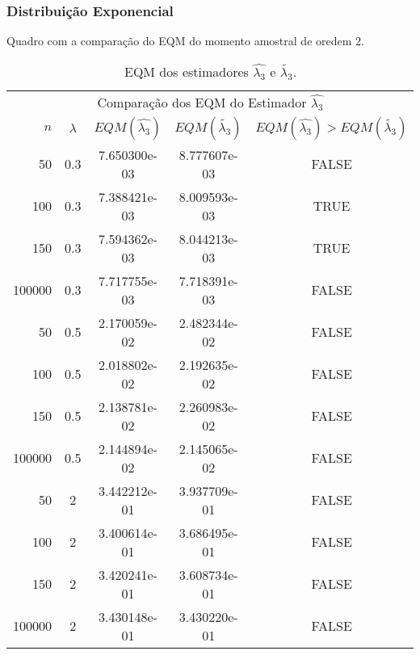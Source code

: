 \begin{frame}
\frametitle{Distribuição Exponencial}
Quadro com a comparação do EQM do momento amostral de oredem 2.

\begin{table}[H]
\caption{EQM dos estimadores $\hat{\lambda_{3}}$ e $\tilde{\lambda_{3}}$.}
\label{tab:p1EQM}
\tiny
\centering
\begin{tabular}{rcccc}
\toprule
\multicolumn{5}{c}{Comparação dos EQM do Estimador $\hat{\lambda_{3}}$}\\
$n$ & $\lambda$ & $EQM(\hat{\lambda_{3}})$ & $EQM(\tilde{\lambda_{3}})$ & $EQM(\hat{\lambda_{3}})>EQM(\tilde{\lambda_{3}})$ \\
\midrule
50 & 0.3 & 7.650300e-03 & 8.777607e-03  & FALSE \\
100 & 0.3 & 7.388421e-03 & 8.009593e-03 & TRUE \\
150 & 0.3 & 7.594362e-03 & 8.044213e-03 & TRUE \\
100000 & 0.3 & 7.717755e-03 & 7.718391e-03 & FALSE \\
\midrule
50 & 0.5 & 2.170059e-02 & 2.482344e-02  & FALSE \\
100 & 0.5 &  2.018802e-02 & 2.192635e-02 & FALSE \\
150 & 0.5 &  2.138781e-02  & 2.260983e-02 & FALSE\\
100000 & 0.5 & 2.144894e-02 & 2.145065e-02 & FALSE \\
\midrule
50 & 2 & 3.442212e-01 &  3.937709e-01 & FALSE \\
100 & 2 & 3.400614e-01 &  3.686495e-01 & FALSE \\
150 & 2 & 3.420241e-01 & 3.608734e-01 & FALSE \\
100000 & 2 & 3.430148e-01 & 3.430220e-01 & FALSE \\
\bottomrule
\end{tabular}
\end{table}
\end{frame}